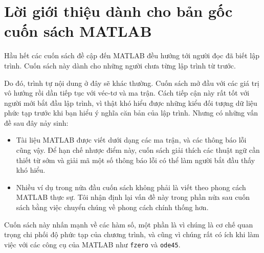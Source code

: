 \documentclass[12pt]{book}
\begin{document}



\section*{Lời giới thiệu dành cho bản gốc cuốn sách MATLAB}

Hầu hết các cuốn sách đề cập đến MATLAB đều hướng tới người đọc 
đã biết lập trình. Cuốn sách này dành cho những người chưa từng 
lập trình từ trước.

Do đó, trình tự nội dung ở đây sẽ khác thường. Cuốn sách mở đầu với
các giá trị vô hướng rồi dần tiếp tục với véc-tơ và ma trận. Cách tiếp
cận này rất tốt với người mới bắt đầu lập trình, vì thật khó hiểu được
những kiểu đối tượng dữ liệu phức tạp trước khi bạn hiểu ý nghĩa
căn bản của lập trình. Nhưng có những vấn đề sau đây nảy sinh:

\begin{itemize}

\item Tài liệu MATLAB được viết dưới dạng các ma trận, và các
thông báo lỗi cũng vậy. Để hạn chế nhược điểm này, cuốn sách
giải thích các thuật ngữ cần thiết từ sớm và giải mã một số 
thông báo lỗi có thể làm người bắt đầu thấy khó hiểu.

\item Nhiều ví dụ trong nửa đầu cuốn sách không phải là viết theo
phong cách MATLAB thực sự. Tôi nhận định lại vấn đề này trong phần
nửa sau cuốn sách bằng việc chuyển chúng về phong cách chính thống
hơn.

\end{itemize}

Cuốn sách này nhấn mạnh về các hàm số, một phần là vì chúng là 
cơ chế quan trọng chi phối độ phức tạp của chương trình, và cũng 
vì chúng rất có ích khi làm việc với các công cụ của MATLAB như 
{\tt fzero} và {\tt ode45}.
\end{document}
